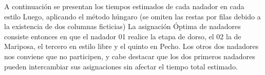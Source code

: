 
\begin{homeworkProblem}
A continuación se presentan los tiempos estimados de cada nadador en cada estilo
Luego, aplicando el método húngaro (se omiten las restas por filas debido a la existencia de dos columnas ficticias)
La asignación Óptima de nadadores consiste entonces en que el nadador 01 realice la etapa de dorso, el 02 la de Mariposa, el tercero en estilo libre y el quinto en Pecho. Los otros dos nadadores nos conviene que no participen, y cabe destacar que los dos primeros nadadores pueden intercambiar sus asignaciones sin afectar el tiempo total estimado.
\end{homeworkProblem}


